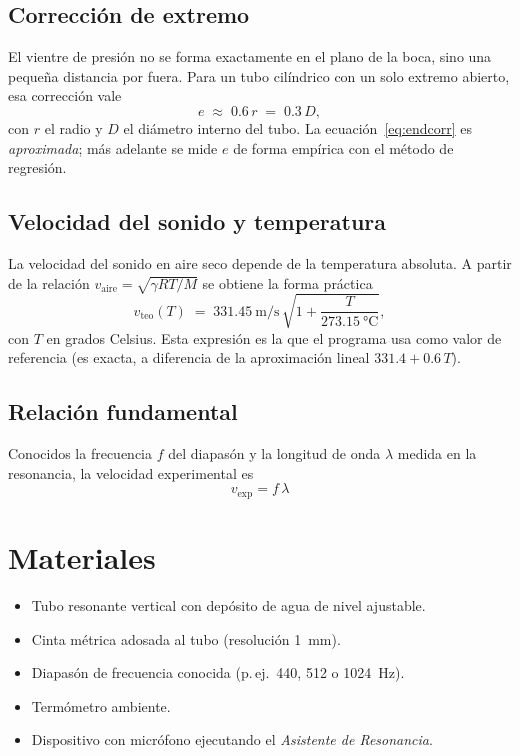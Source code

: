 \documentclass[11pt,a4paper]{article}
\newcommand{\vsound}{v_{\text{aire}}}
\newcommand{\vexp}{v_{\text{exp}}}
\newcommand{\vteo}{v_{\text{teo}}}
\begin{document}
\subsection{Corrección de extremo}\label{sec:correccion}
El vientre de presión no se forma exactamente en el plano de la boca, sino una pequeña
distancia por fuera. Para un tubo cilíndrico con un solo extremo abierto, esa corrección vale
\begin{equation}
  e \;\approx\; 0.6\,r \;=\; 0.3\,D,
  \label{eq:endcorr}
\end{equation}
con $r$ el radio y $D$ el diámetro interno del tubo. La ecuación~\eqref{eq:endcorr} es
\emph{aproximada}; más adelante se mide $e$ de forma empírica con el método de regresión.

\subsection{Velocidad del sonido y temperatura}
La velocidad del sonido en aire seco depende de la temperatura absoluta. A partir de la
relación $\vsound=\sqrt{\gamma R T/M}$ se obtiene la forma práctica
\begin{equation}
  \vteo(T) \;=\; \SI{331.45}{\meter\per\second}\,\sqrt{1+\dfrac{T}{\SI{273.15}{\celsius}}},
  \label{eq:vteo}
\end{equation}
con $T$ en grados Celsius. Esta expresión es la que el programa usa como valor de referencia
(es exacta, a diferencia de la aproximación lineal $331.4+0.6\,T$).

\subsection{Relación fundamental}
Conocidos la frecuencia $f$ del diapasón y la longitud de onda $\lambda$ medida en la
resonancia, la velocidad experimental es
\begin{equation}
  \boxed{\;\vexp = f\,\lambda\;}
  \label{eq:fundamental}
\end{equation}

\section{Materiales}
\begin{itemize}[nosep]
  \item Tubo resonante vertical con depósito de agua de nivel ajustable.
  \item Cinta métrica adosada al tubo (resolución \SI{1}{\milli\meter}).
  \item Diapasón de frecuencia conocida (p.\,ej.\ \SI{440}{}, \SI{512}{} o \SI{1024}{\hertz}).
  \item Termómetro ambiente.
  \item Dispositivo con micrófono ejecutando el \emph{Asistente de Resonancia}.
\end{itemize}
\end{document}
